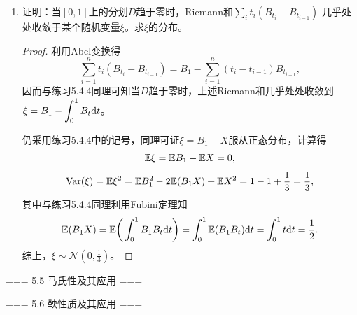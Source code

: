 \begin{enumerate}
\begin{proof}
        现在可以计算得
        \[\E(e^X)=\int_{-\infty}^\infty e^x\frac{1}{\sqrt{2\pi\sigma^2}}e^{-\frac{x^2}{2\sigma^2}}{\rm d}x
        =\int_{-\infty}^\infty\frac{1}{\sqrt{2\pi\sigma^2}}e^{-\frac{(x-\sigma^2)^2}{2\sigma^2}+\frac{\sigma^2}{2}}{\rm d}x
        =e^{\frac{\sigma^2}{2}}=e^{\frac{1}{6}},\]
        \[\E(e^{2X})=\int_{-\infty}^\infty e^{2x}\frac{1}{\sqrt{2\pi\sigma^2}}e^{-\frac{x^2}{2\sigma^2}}{\rm d}x
        =\int_{-\infty}^\infty\frac{1}{\sqrt{2\pi\sigma^2}}e^{-\frac{(x-2\sigma^2)^2}{2\sigma^2}+2\sigma^2}{\rm d}x
        =e^{2\sigma^2}=e^{\frac{2}{3}},\]
        \[\operatorname{Var}(e^X)=\E(e^{2X})-(\E(e^X))^2=e^{\frac{2}{3}}-e^{\frac{1}{3}}.\]
    \end{proof}
    \item[5.4.5] 证明：当$[0,1]$上的分划$D$趋于零时，Riemann和$\sum\limits_it_i(B_{t_i}-B_{t_{i-1}})$
    几乎处处收敛于某个随机变量$\xi$。求$\xi$的分布。
    \begin{proof}
        利用Abel变换得
        \[\sum_{i=1}^nt_i(B_{t_i}-B_{t_{i-1}})=B_1-\sum_{i=1}^n(t_i-t_{i-1})B_{t_{i-1}},\]
        因而与练习5.4.4同理可知当$D$趋于零时，上述Riemann和几乎处处收敛到$\xi=B_1-\displaystyle\int_0^1B_t{\rm d}t$。
        
        仍采用练习5.4.4中的记号，同理可证$\xi=B_1-X$服从正态分布，计算得
        \[\mathbb{E}\xi=\mathbb{E} B_1-\mathbb{E} X=0,\]
        \[\operatorname{Var}(\xi)=\mathbb{E}\xi^2=\mathbb{E} B_1^2-2\mathbb{E}(B_1X)+\mathbb{E} X^2=1-1+\frac{1}{3}=\frac{1}{3},\]
        其中与练习5.4.4同理利用Fubini定理知
        \[\mathbb{E}(B_1X)=\mathbb{E}\bigg(\int_0^1B_1B_t{\rm d}t\bigg)=\int_0^1\mathbb{E}(B_1B_t){\rm d}t=\int_0^1t{\rm d}t=\frac{1}{2}.\]
        综上，$\xi\sim\mathcal{N}(0,\frac{1}{3})$。
    \end{proof}
\end{enumerate}

=== 5.5 马氏性及其应用 ===

=== 5.6 鞅性质及其应用 ===